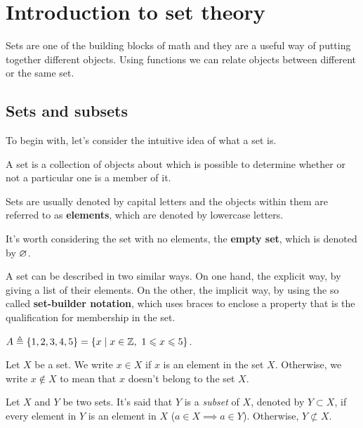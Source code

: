 \chapter{Introduction to set theory}
\thispagestyle{noheaders}

Sets are one of the building blocks of math and they are a useful way of putting together different objects. Using 
functions we can relate objects between different or the same set.

\section{Sets and subsets}
To begin with, let's consider the intuitive idea of what a set is.

\begin{defn}[Set]
    A set is a collection of objects about which is possible to determine whether or not a particular one is a member of it.
\end{defn}

\begin{note}
    Sets are usually denoted by capital letters and the objects within them are referred to as \textbf{elements}, which are
    denoted by lowercase letters.
\end{note}

\begin{note}
    It's worth considering the set with no elements, the \textbf{empty set}, which is denoted by $\O$.
\end{note}

A set can be described in two similar ways. On one hand, the explicit way, by giving a list of their elements. On the other,
the implicit way, by using the so called \textbf{set-builder notation}, which uses braces to enclose a property that is the
qualification for membership in the set.

\begin{example}
    $A\bydef\set{1, 2, 3, 4, 5} = \set{x\st x\in\Z,\ 1\leq x\leq 5}$.
\end{example}

\begin{note}
    Let $X$ be a set. We write $x\in X$ if $x$ is an element in the set $X$. Otherwise, we write $x\not\in X$ to mean that
    $x$ doesn't belong to the set $X$. 
\end{note}

\begin{defn}[Subset]
    Let $X$ and $Y$ be two sets. It's said that $Y$ is a \textit{subset} of $X$, denoted by $Y\subset X$, if every element in 
    $Y$ is an element in $X$ ($a\in X\implies a\in Y$). Otherwise, $Y\not\subset X$.
\end{defn}


